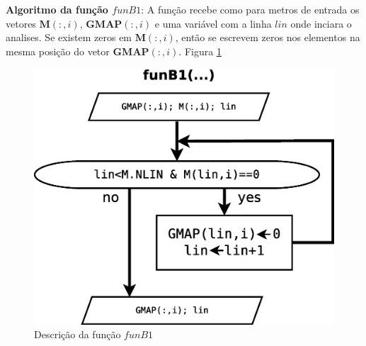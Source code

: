 \documentclass[a4paper,10pt]{article}
\begin{document}
\textbf{Algoritmo da função $funB1$}:
A função recebe como para metros de entrada os vetores $\mathbf{M}(:,i)$, $\mathbf{GMAP}(:,i)$
e uma variável com a linha $lin$ onde inciara o analises.
Se existem zeros em $\mathbf{M}(:,i)$, então se escrevem zeros nos elementos na mesma posição 
do vetor $\mathbf{GMAP}(:,i)$.
Figura \ref{fig:funB1}
\begin{figure}[!htb]
\centering
\includegraphics[scale=0.25]{funB1.eps}
\caption{Descrição da função $funB1$ }
\label{fig:funB1}
\end{figure}
\end{document}

